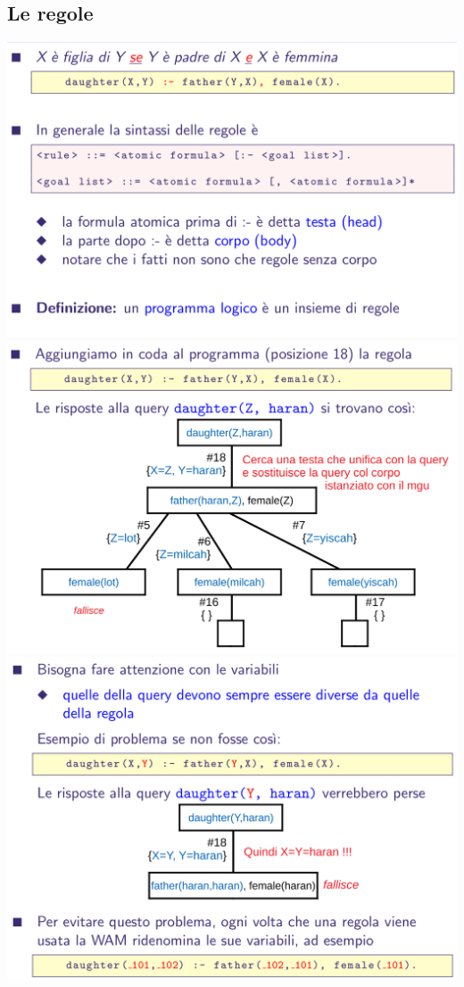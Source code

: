 \documentclass[10pt]{article}
\begin{document}
\subsection{Le regole}
\includegraphics[scale=0.25]{Immagini/pl17.png}
\\
\includegraphics[scale=0.25]{Immagini/pl18.png}
\\
\includegraphics[scale=0.25]{Immagini/pl19.png}
\end{document}
